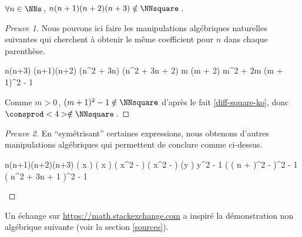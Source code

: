 \begin{fact} \label{case-4}
	 $\forall n \in \NNs$\,, $n(n+1)(n+2)(n+3) \notin \NNsquare$\,.
\end{fact}




\begin{proof}[Preuve 1]
    Nous pouvons ici faire les manipulations algébriques naturelles suivantes qui cherchent à obtenir le même coefficient pour $n$ dans chaque parenthèse.
    
    \medskip
    
    \begin{stepcalc}[style = sar]
    \explnext{}
    	n(n+3) \cdot (n+1)(n+2)
    \explnext{}
    	(n^2 + 3n) \cdot (n^2 + 3n + 2)
    	m (m + 2)
    \explnext{}
    	m^2 + 2m
    \explnext{}
    	(m + 1)^2 - 1
    \end{stepcalc}
    
    \medskip
    
    Comme $m > 0$\,, $(m + 1)^2 - 1 \notin \NNsquare$ d'après le fait \ref{diff-square-ko}, donc $\consprod<4> \notin \NNsquare$\,. 
\end{proof}




\begin{proof}[Preuve 2]
	En \enquote{symétrisant} certaines expressions, nous obtenons d'autres manipulations algébriques qui permettent de conclure comme ci-dessus.
    
    \medskip
    
    \begin{stepcalc}[style = sar]
    \explnext{}
    	n(n+1)(n+2)(n+3)
    	\big( x \pm {} \big) \big( x \pm {} \big)
    \explnext{}
    	\big( x^2 -  \big) \big( x^2 -  \big)
    	(y )
    \explnext{}
    	y^2 - 1
    \explnext{}
    	\Big( \big( n +  \big)^2 -  \Big)^2 - 1
    \explnext{}
    	\big( n^2 + 3n + 1 \big)^2 - 1
    \end{stepcalc}

    \vspace{-1.5ex}
    \qedhere
\end{proof}




Un échange sur \url{https://math.stackexchange.com} a inspiré la démonstration non algébrique suivante (voir la section \ref{sources}).	
	
